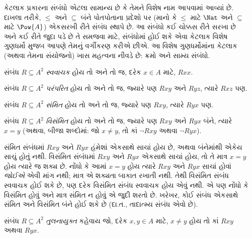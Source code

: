 \documentclass[../../../include/open-logic-section]{subfiles}
\begin{document}

\begin{intro}
કેટલાક પ્રકારના સંબંધો એટલા સામાન્ય છે કે તેમને વિશેષ નામ
આપવામાં આવ્યાં છે. દાખલા તરીકે, $\le$ અને $\subseteq$ બંને
પોતપોતાના પ્રદેશો પર (માનો કે $\le$ માટે $\Nat$ અને
$\subseteq$ માટે $\Pow{A}$) એકસરખી રીતે સંબંધ સ્થાપે છે.
આ સંબંધો કઈ ચોક્કસ રીતે સરખા છે અને કઈ રીતે જુદા પડે છે તે
સમજવા માટે, સંબંધોમાં હોઈ શકે એવા કેટલાક વિશેષ ગુણધર્મો મુજબ
આપણે તેમનું વર્ગીકરણ કરીએ છીએ. આ વિશેષ ગુણધર્મોમાંના કેટલાક
(અથવા તેમના સંયોજનો) ખાસ મહત્વના નીવડે છે: ક્રમો અને સામ્ય સંબંધો.
\end{intro}

\begin{defn}[સ્વવાચકતા]
સંબંધ $R \subseteq A^2$ \emph{સ્વવાચક} હોય તો અને તો જ,
દરેક $x \in A$ માટે, $Rxx$.
\end{defn}

\begin{defn}[પરંપરિતતા]
સંબંધ $R \subseteq A^2$ \emph{પરંપરિત} હોય તો અને તો જ,
જ્યારે પણ $Rxy$ અને $Ryz$, ત્યારે $Rxz$ પણ.
\end{defn}

\begin{defn}[સંમિતતા]
સંબંધ $R \subseteq A^2$ \emph{સંમિત} હોય તો અને તો જ,
જ્યારે પણ $Rxy$, ત્યારે $Ryx$ પણ.
\end{defn}

\begin{defn}[વિસંમિતતા]
સંબંધ $R \subseteq A^2$ \emph{વિસંમિત} હોય તો અને તો જ,
જ્યારે પણ $Rxy$ અને $Ryx$ બંને, ત્યારે $x=y$
(અથવા, બીજા શબ્દોમાં: જો $x\neq y$, તો
કાં $\lnot Rxy$ અથવા $\lnot Ryx$).
\end{defn}

\begin{explain}
સંમિત સંબંધમાં $Rxy$ અને $Ryx$ હંમેશાં એકસાથે સાચાં હોય છે,
અથવા બંનેમાંથી એકેય સાચું હોતું નથી. વિસંમિત સંબંધમાં
$Rxy$ અને $Ryx$ એકસાથે સાચાં હોય, તો તે માત્ર $x = y$
હોય ત્યારે જ શક્ય છે. નોંધો કે આમાં $x = y$ હોય ત્યારે
$Rxy$ અને $Ryx$ સાચાં હોવાં \emph{જોઈએ} એવી માંગ નથી;
માત્ર એ શક્યતા બાકાત રખાતી નથી. તેથી વિસંમિત સંબંધ
સ્વવાચક હોઈ શકે છે, પણ દરેક વિસંમિત સંબંધ સ્વવાચક હોય
એવું નથી. એ પણ નોંધો કે વિસંમિત હોવું અને માત્ર સંમિત
ન હોવું એ જુદી શરતો છે. ખરેખર, કોઈ સંબંધ એકસાથે સંમિત
અને વિસંમિત બંને હોઈ શકે છે (દા.ત., તાદાત્મ્ય સંબંધ એવો છે).
\end{explain}

\begin{defn}[તુલનાયુક્તતા]
સંબંધ $R \subseteq A^2$ \emph{તુલનાયુક્ત} કહેવાય જો,
દરેક $x,y\in A$ માટે, $x \neq y$ હોય તો
કાં $Rxy$ અથવા $Ryx$.
\end{defn}
\end{document}
